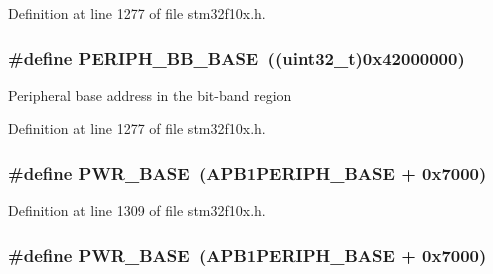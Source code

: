 Definition at line 1277 of file stm32f10x.\+h.

\subsubsection[{\texorpdfstring{P\+E\+R\+I\+P\+H\+\_\+\+B\+B\+\_\+\+B\+A\+SE}{PERIPH_BB_BASE}}]{\setlength{\rightskip}{0pt plus 5cm}\#define P\+E\+R\+I\+P\+H\+\_\+\+B\+B\+\_\+\+B\+A\+SE~(({\bf uint32\+\_\+t})0x42000000)}\hypertarget{group___peripheral__memory__map_gaed7efc100877000845c236ccdc9e144a}{}\label{group___peripheral__memory__map_gaed7efc100877000845c236ccdc9e144a}
Peripheral base address in the bit-\/band region 

Definition at line 1277 of file stm32f10x.\+h.

\subsubsection[{\texorpdfstring{P\+W\+R\+\_\+\+B\+A\+SE}{PWR_BASE}}]{\setlength{\rightskip}{0pt plus 5cm}\#define P\+W\+R\+\_\+\+B\+A\+SE~({\bf A\+P\+B1\+P\+E\+R\+I\+P\+H\+\_\+\+B\+A\+SE} + 0x7000)}\hypertarget{group___peripheral__memory__map_gac691ec23dace8b7a649a25acb110217a}{}\label{group___peripheral__memory__map_gac691ec23dace8b7a649a25acb110217a}


Definition at line 1309 of file stm32f10x.\+h.

\subsubsection[{\texorpdfstring{P\+W\+R\+\_\+\+B\+A\+SE}{PWR_BASE}}]{\setlength{\rightskip}{0pt plus 5cm}\#define P\+W\+R\+\_\+\+B\+A\+SE~({\bf A\+P\+B1\+P\+E\+R\+I\+P\+H\+\_\+\+B\+A\+SE} + 0x7000)}\hypertarget{group___peripheral__memory__map_gac691ec23dace8b7a649a25acb110217a}{}\label{group___peripheral__memory__map_gac691ec23dace8b7a649a25acb110217a}


